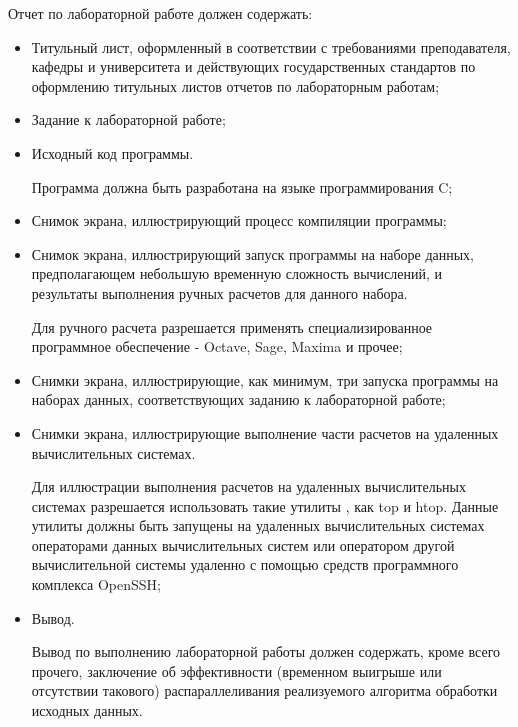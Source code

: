 
Отчет по лабораторной работе должен содержать:

\begin{itemize}

	\item Титульный лист, оформленный в соответствии с требованиями преподавателя, кафедры и университета и действующих государственных стандартов по оформлению титульных листов отчетов по лабораторным работам;
	
	\item Задание к лабораторной работе;

	\item Исходный код программы.

	Программа должна быть разработана на языке программирования C;

	\item Снимок экрана, иллюстрирующий процесс компиляции программы;

	\item Снимок экрана, иллюстрирующий запуск программы на наборе данных, предполагающем небольшую временную сложность вычислений, и результаты выполнения ручных расчетов для данного набора.

	Для ручного расчета разрешается применять специализированное программное обеспечение - Octave, Sage, Maxima и прочее;

	\item Снимки экрана, иллюстрирующие, как минимум, три запуска программы на наборах данных, соответствующих заданию к лабораторной работе;

	\item Снимки экрана, иллюстрирующие выполнение части расчетов на удаленных вычислительных системах.

	Для иллюстрации выполнения расчетов на удаленных вычислительных системах разрешается использовать такие утилиты \gl, как top и htop. Данные утилиты должны быть запущены на удаленных вычислительных системах операторами данных вычислительных систем или оператором другой вычислительной системы удаленно с помощью средств программного комплекса OpenSSH;

	\item Вывод.

	Вывод по выполнению лабораторной работы должен содержать, кроме всего прочего, заключение об эффективности (временном выигрыше или отсутствии такового) распараллеливания реализуемого алгоритма обработки исходных данных.

\end{itemize}

